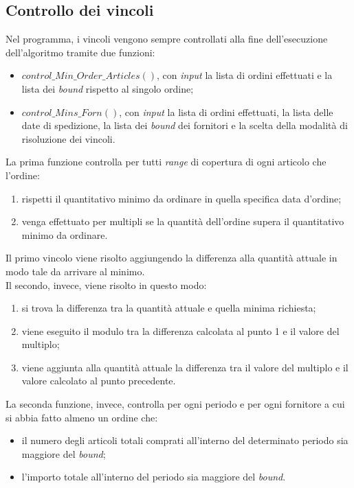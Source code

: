 \subsection{Controllo dei vincoli}
\label{sec:controllo-vincoli}
\noindent Nel programma, i vincoli vengono sempre controllati alla fine dell'esecuzione dell'algoritmo
tramite due funzioni:
\begin{itemize}
    \item $control\_Min\_Order\_Articles()$, con \textit{input} la
    lista di ordini effettuati e la lista dei \textit{bound} rispetto
    al singolo ordine;
    \item $control\_Mins\_Forn()$, con \textit{input} la lista di
    ordini effettuati, la lista delle date di spedizione,
    la lista dei \textit{bound} dei fornitori e la scelta della
    modalità di risoluzione dei vincoli.
\end{itemize}
\noindent La prima funzione controlla per tutti \textit{range} di
copertura di ogni articolo che l'ordine:
\begin{enumerate}
    \item rispetti il quantitativo minimo
    da ordinare in quella specifica data d'ordine;
    \item venga effettuato per multipli se la quantità
    dell'ordine supera il quantitativo minimo da ordinare.
\end{enumerate}
Il primo vincolo viene risolto aggiungendo la differenza alla quantità attuale
in modo tale da arrivare al minimo.\\
Il secondo, invece, viene risolto in questo modo:
\begin{enumerate}
    \item si trova la differenza tra la quantità attuale
    e quella minima richiesta;
    \item viene eseguito il modulo tra la differenza calcolata al punto 1 e il valore del multiplo;
    \item viene aggiunta alla quantità attuale la differenza tra il valore del multiplo e il valore calcolato al punto precedente.
\end{enumerate}
\vspace*{0.5cm}
\noindent La seconda funzione, invece, controlla per ogni 
periodo e per ogni fornitore a cui si abbia fatto
almeno un ordine che:
\begin{itemize}
    \item il numero degli articoli totali comprati all'interno
    del determinato periodo sia maggiore del \textit{bound};
    \item l'importo totale all'interno del periodo sia
    maggiore del \textit{bound}.
\end{itemize}
